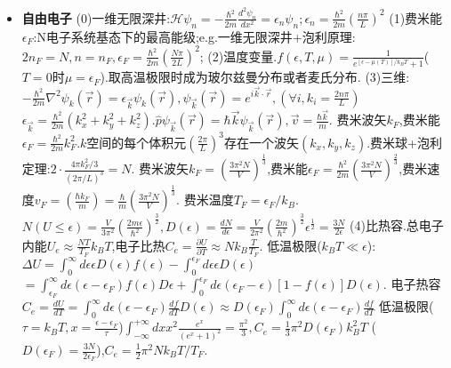 \documentclass[UTF8,a4paper,3pt,twocolumn]{ctexart}
\begin{document}
\begin{itemize}
  \item \textbf{自由电子}
  (0)一维无限深井:$\mathcal{H}\psi_{n}=-\frac{\hbar^2}{2m}\frac{d^2\psi_{n}}{dx^2}=\epsilon_{n}\psi_{n};\epsilon_{n}=\frac{\hbar^2}{2m}(\frac{n\pi}{L})^2$
  (1)费米能$\epsilon_{F}$:N电子系统基态下的最高能级;e.g.一维无限深井+泡利原理:$2n_F=N,n=n_F,\epsilon_F=\frac{\hbar^2}{2m}(\frac{N\pi}{2L})^2$;
  (2)温度变量.$f(\epsilon,T,\mu)=\frac{1}{e^{[\epsilon-\mu(T)]/k_{B}T}+1}$($T=0$时$\mu=\epsilon_F$).取高温极限时成为玻尔兹曼分布或者麦氏分布.
  (3)三维:$-\frac{\hbar^2}{2m}\nabla^2\psi_{k}(\vec{r})=\epsilon_{\vec{k}}\psi_{k}(\vec{r}),\psi_{\vec{k}}(\vec{r})=e^{i\vec{k}\cdot\vec{r}},(\forall i,k_i=\frac{2n\pi}{L})$
  $\epsilon_{\vec{k}}=\frac{\hbar^2}{2m}(k_x^2+k_y^2+k_z^2)$.$\hat{p}\psi_{\vec{k}}(\vec{r})=\hbar\vec{k}\psi_{\vec{k}}(\vec{r}),\vec{v}=\frac{\hbar\vec{k}}{m}$.
  费米波矢$k_F$,费米能$\epsilon_F=\frac{\hbar^2}{2m}k_{F}^2$.$k$空间的每个体积元$(\frac{2\pi}{L})^3$存在一个波矢$(k_x,k_y,k_z)$.费米球+泡利定理:$2\cdot\frac{4\pi k_F^2/3}{(2\pi/L)^3}=N$.
  费米波矢$k_F=(\frac{3\pi^2N}{V})^{\frac{1}{3}}$,费米能$\epsilon_{F}=\frac{\hbar^2}{2m}(\frac{3\pi^2N}{V})^{\frac{2}{3}}$,费米速度$v_F=(\frac{\hbar k_F}{m})=\frac{\hbar}{m}(\frac{3\pi^2N}{V})^{\frac{1}{3}}$.
  费米温度$T_F=\epsilon_F/k_B$.$N(U\leq\epsilon)=\frac{V}{3\pi^2}(\frac{2m\epsilon}{\hbar^2})^{\frac{3}{2}},D(\epsilon)=\frac{dN}{d\epsilon}=\frac{V}{2\pi^2}(\frac{2m}{\hbar^2})^{\frac{3}{2}}\epsilon^{\frac{1}{2}}=\frac{3N}{2\epsilon}$
  (4)比热容.总电子内能$U_{e}\approx\frac{NT}{T_F}k_B T$,电子比热$C_{e}=\frac{\partial U}{\partial T}\approx Nk_B \frac{T}{T_F}$.
  低温极限($k_B T\ll \epsilon$):$\Delta U=\int_0^{\infty}d\epsilon\epsilon D(\epsilon)f(\epsilon)-\int_0^{\epsilon_F}d\epsilon\epsilon D(\epsilon)$
  $=\int_{\epsilon_F}^{\infty}d\epsilon(\epsilon-\epsilon_F)f(\epsilon)D\epsilon + \int_0^{\epsilon_F}d\epsilon(\epsilon_F-\epsilon)[1-f(\epsilon)]D(\epsilon)$.
  电子热容$C_e=\frac{dU}{dT}=\int_{0}^{\infty}d\epsilon(\epsilon-\epsilon_F)\frac{df}{dT}D(\epsilon)\approx D(\epsilon_F)\int_0^{\infty}d\epsilon(\epsilon-\epsilon_F)\frac{df}{dT}$
  低温极限($\tau=k_B T,x=\frac{\epsilon-\epsilon_F}{\tau}$)$\int_{-\infty}^{+\infty}dxx^2\frac{e^x}{(e^x +1)^2}=\frac{\pi^2}{3},C_e=\frac{1}{3}\pi^2D(\epsilon_F)k_B^2T$
  ($D(\epsilon_F)=\frac{3N}{2\epsilon_F}$),$C_e=\frac{1}{2}\pi^2Nk_BT/T_F$.
\end{itemize}


\end{document}
